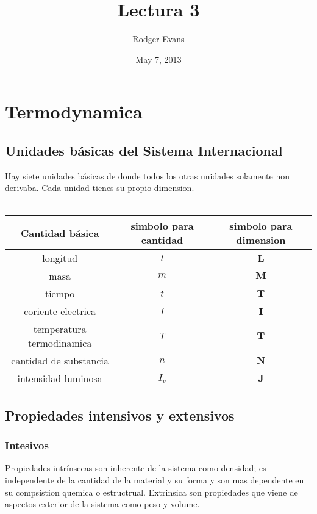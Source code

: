 \documentclass[11pt]{article}
\begin{document}
\title{Lectura 3}
\author{Rodger Evans}
\date{ May 7, 2013 }
\maketitle

\section{Termodynamica}

\subsection{Unidades b\'asicas del Sistema Internacional}

Hay siete unidades b\'asicas de donde todos los otras unidades solamente non derivaba. Cada unidad tienes su propio dimension. 
\\
\\
\begin{tabular}{c c c}
Cantidad b\'asica & simbolo para cantidad & simbolo para dimension \\
\hline
longitud & $l$ & $ \boldsymbol{L}$\\
masa & $m$ & $ \boldsymbol{M}$\\
tiempo & $t$ & $\boldsymbol{T}$\\
coriente electrica & $I$ & $\boldsymbol{I}$\\
temperatura termodinamica & $T$& $ \boldsymbol{T}$\\
cantidad de substancia & $n$ & $ \boldsymbol{N}$\\
intensidad luminosa & $I_v$ & $ \boldsymbol{J}$\\
\hline
\end{tabular}


\subsection{Propiedades intensivos y extensivos}

\subsubsection{Intesivos}

Propiedades intr\'insecas son inherente de la sistema como densidad; es independente de la cantidad de la material y su forma y son mas dependente en su compsistion quemica o estructrual. 
Extrinsica son propiedades que viene de aspectos exterior de la sistema como peso y volume.
\end{document}
